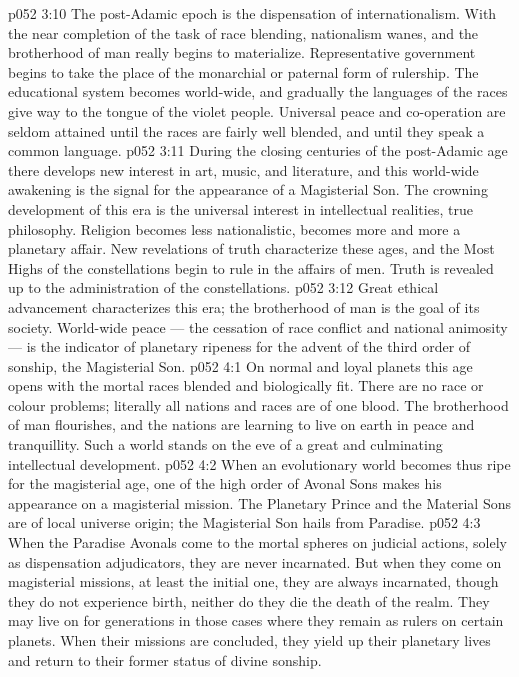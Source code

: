 \vs p052 3:10 \pc The post\hyp{}Adamic epoch is the dispensation of internationalism. With the near completion of the task of race blending, nationalism wanes, and the brotherhood of man really begins to materialize. Representative government begins to take the place of the monarchial or paternal form of rulership. The educational system becomes world\hyp{}wide, and gradually the languages of the races give way to the tongue of the violet people. Universal peace and co\hyp{}operation are seldom attained until the races are fairly well blended, and until they speak a common language.
\vs p052 3:11 During the closing centuries of the post\hyp{}Adamic age there develops new interest in art, music, and literature, and this world\hyp{}wide awakening is the signal for the appearance of a Magisterial Son. The crowning development of this era is the universal interest in intellectual realities, true philosophy. Religion becomes less nationalistic, becomes more and more a planetary affair. New revelations of truth characterize these ages, and the Most Highs of the constellations begin to rule in the affairs of men. Truth is revealed up to the administration of the constellations.
\vs p052 3:12 Great ethical advancement characterizes this era; the brotherhood of man is the goal of its society. World\hyp{}wide peace --- the cessation of race conflict and national animosity --- is the indicator of planetary ripeness for the advent of the third order of sonship, the Magisterial Son.
\vs p052 4:1 On normal and loyal planets this age opens with the mortal races blended and biologically fit. There are no race or colour problems; literally all nations and races are of one blood. The brotherhood of man flourishes, and the nations are learning to live on earth in peace and tranquillity. Such a world stands on the eve of a great and culminating intellectual development.
\vs p052 4:2 \pc When an evolutionary world becomes thus ripe for the magisterial age, one of the high order of Avonal Sons makes his appearance on a magisterial mission. The Planetary Prince and the Material Sons are of local universe origin; the Magisterial Son hails from Paradise.
\vs p052 4:3 When the Paradise Avonals come to the mortal spheres on judicial actions, solely as dispensation adjudicators, they are never incarnated. But when they come on magisterial missions, at least the initial one, they are always incarnated, though they do not experience birth, neither do they die the death of the realm. They may live on for generations in those cases where they remain as rulers on certain planets. When their missions are concluded, they yield up their planetary lives and return to their former status of divine sonship.
